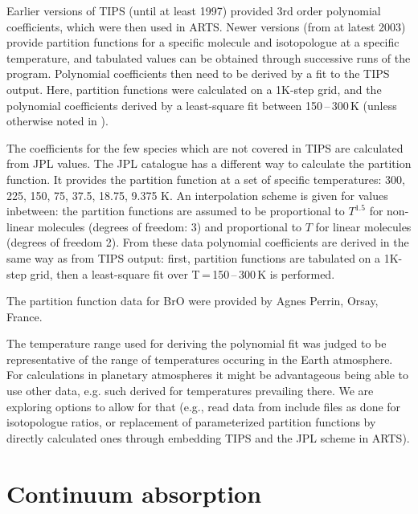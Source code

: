 Earlier versions of TIPS (until at least 1997) provided 3rd order polynomial
coefficients, which were then used in ARTS.
Newer versions (from at latest 2003) provide partition
functions for a specific molecule and isotopologue at a specific temperature,
and tabulated values can be obtained through successive runs of the program.
Polynomial coefficients then need to be derived by a fit to the TIPS output.
Here, partition functions were calculated on a 1K-step grid, and the polynomial
coefficients derived by a least-square fit between 150\,--\,300\,K (unless
otherwise noted in ).

The coefficients for the few species which are not covered in
TIPS are calculated from JPL values. The JPL catalogue has a
different way to calculate the partition function. It provides the
partition function at a set of specific temperatures: 300, 225, 150, 75, 37.5,
18.75, 9.375 K. An interpolation scheme is given for values
inbetween: the partition functions are assumed to be proportional to $T^{1.5}$
for non-linear molecules (degrees of freedom: 3) and proportional to $T$ for
linear molecules (degrees of freedom 2).
From these data polynomial coefficients are derived in the same way as from TIPS
output: first, partition functions are tabulated on a 1K-step grid, then a
least-square fit over T\,=\,150\,--\,300\,K is performed.

The partition function data for BrO were provided by Agnes
Perrin, Orsay, France.

The temperature range used for deriving the polynomial fit was judged to be
representative of the range of temperatures occuring in the Earth atmosphere.
For calculations in planetary atmospheres it might be advantageous being able to
use other data, e.g. such derived for temperatures prevailing there. We are
exploring options to allow for that (e.g., read data from include files as
done for isotopologue ratios, or replacement of parameterized partition
functions by directly calculated ones through embedding TIPS and the JPL scheme
in ARTS).


\section{Continuum absorption}
\label{sec:abs_theory:ContAbs}

